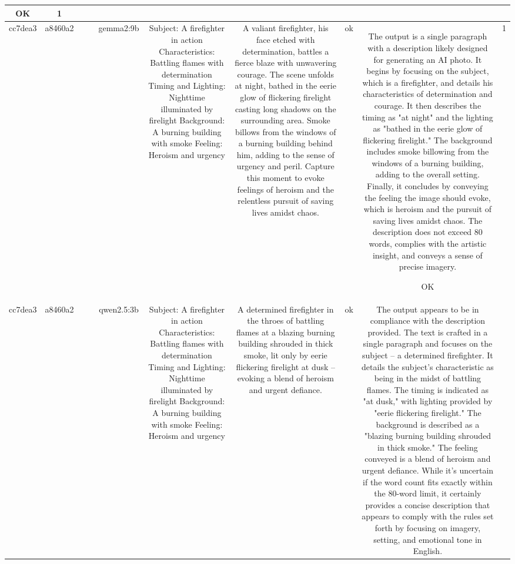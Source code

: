 \begin{table}[h!]
\begin{tabular}{|c|c|c|c|c|c|c|c|c|c|}
OK & 1\\
\hline
cc7dea3 & a8460a2 &  &  & gemma2:9b & Subject: A firefighter in action  
Characteristics: Battling flames with determination  
Timing and Lighting: Nighttime illuminated by firelight  
Background: A burning building with smoke  
Feeling: Heroism and urgency & A valiant firefighter, his face etched with determination, battles a fierce blaze with unwavering courage. The scene unfolds at night, bathed in the eerie glow of flickering firelight casting long shadows on the surrounding area. Smoke billows from the windows of a burning building behind him, adding to the sense of urgency and peril. Capture this moment to evoke feelings of heroism and the relentless pursuit of saving lives amidst chaos. 


 & ok & The output is a single paragraph with a description likely designed for generating an AI photo. It begins by focusing on the subject, which is a firefighter, and details his characteristics of determination and courage. It then describes the timing as "at night" and the lighting as "bathed in the eerie glow of flickering firelight." The background includes smoke billowing from the windows of a burning building, adding to the overall setting. Finally, it concludes by conveying the feeling the image should evoke, which is heroism and the pursuit of saving lives amidst chaos. The description does not exceed 80 words, complies with the artistic insight, and conveys a sense of precise imagery. 

OK & 1\\
\hline
cc7dea3 & a8460a2 &  &  & qwen2.5:3b & Subject: A firefighter in action  
Characteristics: Battling flames with determination  
Timing and Lighting: Nighttime illuminated by firelight  
Background: A burning building with smoke  
Feeling: Heroism and urgency & A determined firefighter in the throes of battling flames at a blazing burning building shrouded in thick smoke, lit only by eerie flickering firelight at dusk – evoking a blend of heroism and urgent defiance. & ok & The output appears to be in compliance with the description provided. The text is crafted in a single paragraph and focuses on the subject – a determined firefighter. It details the subject's characteristic as being in the midst of battling flames. The timing is indicated as "at dusk," with lighting provided by "eerie flickering firelight." The background is described as a "blazing burning building shrouded in thick smoke." The feeling conveyed is a blend of heroism and urgent defiance. While it's uncertain if the word count fits exactly within the 80-word limit, it certainly provides a concise description that appears to comply with the rules set forth by focusing on imagery, setting, and emotional tone in English.


\end{tabular}
\end{table}
